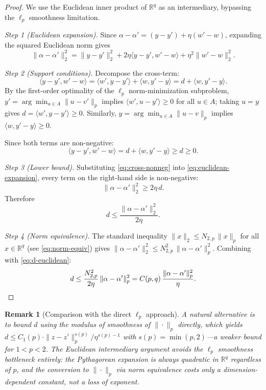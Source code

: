 \documentclass[11pt]{article}
\newtheorem{remark}{Remark}
\newcommand{\R}{\mathbb{R}}
\begin{document}
\begin{proof}
We use the Euclidean inner product of $\R^q$ as an intermediary, bypassing the $\ell_p$ smoothness limitation.

\medskip
\noindent\emph{Step 1 (Euclidean expansion).}
Since $\alpha - \alpha' = (y - y') + \eta(w' - w)$, expanding the squared Euclidean norm gives
\begin{equation}\label{eq:euclidean-expansion}
\|\alpha - \alpha'\|_2^2
= \|y - y'\|_2^2 + 2\eta \langle y - y', w' - w \rangle + \eta^2 \|w' - w\|_2^2.
\end{equation}

\medskip
\noindent\emph{Step 2 (Support conditions).}
Decompose the cross-term:
\[
\langle y - y', w' - w \rangle = \langle w', y - y' \rangle + \langle w, y' - y \rangle = d + \langle w, y' - y \rangle.
\]
By the first-order optimality of the $\ell_p$ norm-minimization subproblem, $y' = \arg\min_{u \in A} \|u - v'\|_p$ implies $\langle w', u - y' \rangle \ge 0$ for all $u \in A$; taking $u = y$ gives $d = \langle w', y - y' \rangle \ge 0$. Similarly, $y = \arg\min_{u \in A} \|u - v\|_p$ implies $\langle w, y' - y \rangle \ge 0$.

Since both terms are non-negative:
\begin{equation}\label{eq:cross-nonneg}
\langle y - y', w' - w \rangle = d + \langle w, y' - y \rangle \ge d \ge 0.
\end{equation}

\medskip
\noindent\emph{Step 3 (Lower bound).}
Substituting \eqref{eq:cross-nonneg} into \eqref{eq:euclidean-expansion}, every term on the right-hand side is non-negative:
\[
\|\alpha - \alpha'\|_2^2 \ge 2\eta \, d.
\]
Therefore
\begin{equation}\label{eq:d-euclidean}
d \le \frac{\|\alpha - \alpha'\|_2^2}{2\eta}.
\end{equation}

\medskip
\noindent\emph{Step 4 (Norm equivalence).}
The standard inequality $\|x\|_2 \le N_{2,p}\,\|x\|_p$ for all $x \in \R^q$ (see \eqref{eq:norm-equiv}) gives $\|\alpha - \alpha'\|_2^2 \le N_{2,p}^2\,\|\alpha - \alpha'\|_p^2$. Combining with \eqref{eq:d-euclidean}:
\[
d \le \frac{N_{2,p}^2}{2\eta}\,\|\alpha - \alpha'\|_p^2 = C(p,q)\,\frac{\|\alpha - \alpha'\|_p^2}{\eta}. \qedhere
\]
\end{proof}

\begin{remark}[Comparison with the direct $\ell_p$ approach]\label{rem:direct-lp}
A natural alternative is to bound $d$ using the modulus of smoothness of $\|\cdot\|_p$ directly, which yields $d \le C_1(p) \cdot \|z - z'\|_p^{s(p)} / \eta^{s(p)-1}$ with $s(p) = \min(p,2)$---a weaker bound for $1 < p < 2$. The Euclidean intermediary argument avoids the $\ell_p$ smoothness bottleneck entirely: the Pythagorean expansion is always quadratic in $\R^q$ regardless of $p$, and the conversion to $\|\cdot\|_p$ via norm equivalence costs only a dimension-dependent constant, not a loss of exponent.
\end{remark}
\end{document}
